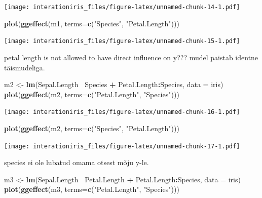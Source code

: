 \documentclass[]{book}
\newenvironment{Shaded}{\begin{snugshade}}{\end{snugshade}}
\newcommand{\KeywordTok}[1]{\textcolor[rgb]{0.13,0.29,0.53}{\textbf{#1}}}
\newcommand{\DataTypeTok}[1]{\textcolor[rgb]{0.13,0.29,0.53}{#1}}
\newcommand{\StringTok}[1]{\textcolor[rgb]{0.31,0.60,0.02}{#1}}
\newcommand{\OperatorTok}[1]{\textcolor[rgb]{0.81,0.36,0.00}{\textbf{#1}}}
\newcommand{\NormalTok}[1]{#1}
\begin{document}
\texttt{[image: interationiris\_files/figure-latex/unnamed-chunk-14-1.pdf]}

\begin{Shaded}
\begin{Highlighting}[]
\KeywordTok{plot}\NormalTok{(}\KeywordTok{ggeffect}\NormalTok{(m1, }\DataTypeTok{terms=}\KeywordTok{c}\NormalTok{(}\StringTok{"Species"}\NormalTok{, }\StringTok{"Petal.Length"}\NormalTok{)))}
\end{Highlighting}
\end{Shaded}

\texttt{[image: interationiris\_files/figure-latex/unnamed-chunk-15-1.pdf]}

petal length is not allowed to have direct influence on y??? mudel
paistab identne täismudeliga.

\begin{Shaded}
\begin{Highlighting}[]
\NormalTok{m2 <-}\StringTok{ }\KeywordTok{lm}\NormalTok{(Sepal.Length}\OperatorTok{~}\StringTok{ }\NormalTok{Species }\OperatorTok{+}\StringTok{ }\NormalTok{Petal.Length}\OperatorTok{:}\NormalTok{Species, }\DataTypeTok{data =}\NormalTok{ iris)}
\KeywordTok{plot}\NormalTok{(}\KeywordTok{ggeffect}\NormalTok{(m2, }\DataTypeTok{terms=}\KeywordTok{c}\NormalTok{(}\StringTok{"Petal.Length"}\NormalTok{, }\StringTok{"Species"}\NormalTok{)))}
\end{Highlighting}
\end{Shaded}

\texttt{[image: interationiris\_files/figure-latex/unnamed-chunk-16-1.pdf]}

\begin{Shaded}
\begin{Highlighting}[]
\KeywordTok{plot}\NormalTok{(}\KeywordTok{ggeffect}\NormalTok{(m2, }\DataTypeTok{terms=}\KeywordTok{c}\NormalTok{(}\StringTok{"Species"}\NormalTok{, }\StringTok{"Petal.Length"}\NormalTok{)))}
\end{Highlighting}
\end{Shaded}

\texttt{[image: interationiris\_files/figure-latex/unnamed-chunk-17-1.pdf]}

species ei ole lubatud omama otsest mõju y-le.

\begin{Shaded}
\begin{Highlighting}[]
\NormalTok{m3 <-}\StringTok{ }\KeywordTok{lm}\NormalTok{(Sepal.Length}\OperatorTok{~}\StringTok{ }\NormalTok{Petal.Length }\OperatorTok{+}\StringTok{ }\NormalTok{Petal.Length}\OperatorTok{:}\NormalTok{Species, }\DataTypeTok{data =}\NormalTok{ iris)}
\KeywordTok{plot}\NormalTok{(}\KeywordTok{ggeffect}\NormalTok{(m3, }\DataTypeTok{terms=}\KeywordTok{c}\NormalTok{(}\StringTok{"Petal.Length"}\NormalTok{, }\StringTok{"Species"}\NormalTok{)))}
\end{Highlighting}
\end{Shaded}
\end{document}

